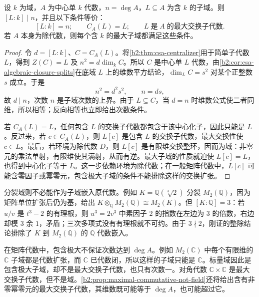 \begin{proposition}\label{b2:prop:csa-self-centralizing-field}
	设 \(k\) 为域，\(A\) 为中心单 \(k\) 代数，\(n=\deg A\)，\(L\subseteq A\) 为含 \(k\) 的子域。则 \([L:k]\mid n\)，并且以下条件等价：
	\[
		[L:k]=n;\qquad C_A(L)=L;\qquad L\;\text{是}\;A\;\text{的最大交换子代数}.
	\]
	若 \(A\) 本身为除代数，则每个含 \(k\) 的最大子域都满足这些条件。
\end{proposition}
\begin{proof}
	令 \(d=[L:k]\)、\(C=C_A(L)\)。将\cref{b2:thm:csa-centralizer}用于简单子代数 \(L\)，得到 \(Z(C)=L\) 及 \(n^2=d\dim_k C\)。所以 \(C\) 是中心单 \(L\) 代数，由\cref{b2:cor:csa-algebraic-closure-splits}在底域 \(L\) 上的维数平方结论，\(\dim_L C=s^2\) 对某个正整数 \(s\) 成立。于是
	\[
		n^2=d^2s^2,\qquad n=ds,
	\]
	故 \(d\mid n\)，次数 \(n\) 是子域次数的上界。由于 \(L\subseteq C\)，当 \(d=n\) 时维数公式使二者同维，所以相等；反向相等也立即给出次数条件。

	若 \(C_A(L)=L\)，任何包含 \(L\) 的交换子代数都包含于该中心化子，因此只能是 \(L\)。反过来，若 \(c\in C_A(L)\)，则 \(L[c]\) 是包含 \(L\) 的交换子代数，最大交换性使 \(c\in L\)。最后，若环境为除代数 \(D\)，则 \(L[c]\) 是有限维交换整环，因而为域：非零元的乘法单射，有限维使其满射，从而有逆。最大子域的性质就迫使 \(L[c]=L\)，也得到中心化子等于 \(L\)。这一步依赖环境为除代数；在一般矩阵代数中，\(L[c]\) 可能含零因子或幂零元，包含极大子域的条件不能排除这样的交换扩张。
\end{proof}

分裂域则不必能作为子域嵌入原代数。例如 \(K=\mathbb Q(\sqrt[3]{2})\) 分裂 \(M_2(\mathbb Q)\)，因为矩阵单位扩张后仍为基，给出 \(K\otimes_{\mathbb Q}M_2(\mathbb Q)\cong M_2(K)\)。但 \([K:\mathbb Q]=3\)：若 \(u/v\) 是 \(t^3-2\) 的有理根，则 \(u^3=2v^3\) 中素因子 \(2\) 的指数在左边为 \(3\) 的倍数，右边却模 \(3\) 余 \(1\)，矛盾；三次多项式没有有理根就不可约。由于 \(3\nmid2\)，刚证的整除结论排除了 \(K\) 到 \(M_2(\mathbb Q)\) 的 \(\mathbb Q\) 代数嵌入。

\ProseParagraphBreak
在矩阵代数中，包含极大不保证次数达到 \(\deg A\)。例如 \(M_2(\mathbb C)\) 中每个有限维的 \(\mathbb C\) 子域都是代数扩张，而 \(\mathbb C\) 已代数闭，所以这样的子域只能是 \(\mathbb C\)。标量域因此是包含极大子域，却不是最大交换子代数，也只有次数一。对角代数 \(\mathbb C\times\mathbb C\) 是最大交换子代数，但不是域。\cref{b2:prop:maximal-commutative-not-field}还将给出含有非零幂零元的最大交换子代数，其维数既可能等于 \(\deg A\)，也可能超过它。

